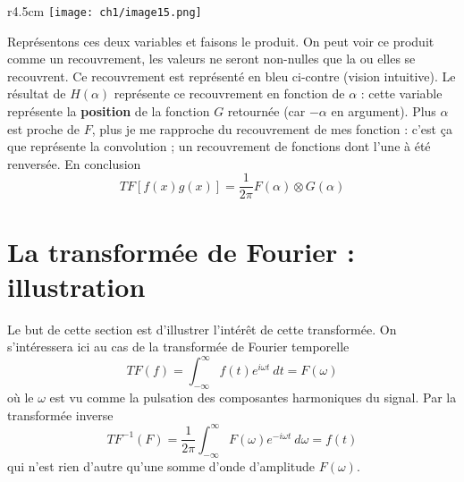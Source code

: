 \begin{wrapfigure}[8]{r}{4.5cm}
\vspace{-6mm}
\texttt{[image: ch1/image15.png]}
\end{wrapfigure}
Représentons ces deux variables et faisons le produit. On peut voir ce produit comme un 
recouvrement, les valeurs ne seront non-nulles que la ou elles se recouvrent. Ce recouvrement 
est représenté en bleu ci-contre (vision intuitive). Le résultat de $H(\alpha)$ représente 
ce recouvrement en fonction de $\alpha$ : cette variable représente la \textbf{position} de la
fonction $G$ retournée (car $-\alpha$ en argument). Plus $\alpha$ est proche de $F$, plus 
je me rapproche du recouvrement de mes fonction : c'est ça que représente la convolution ; un 
recouvrement de fonctions dont l'une à été renversée. En conclusion
\begin{equation}
TF[f(x)g(x)] = \frac{1}{2\pi}F(\alpha)\otimes G(\alpha)
\end{equation}














\newpage
\section{La transformée de Fourier : illustration}
Le but de cette section est d'illustrer l'intérêt de cette transformée. On s'intéressera 
ici au cas de la transformée de Fourier temporelle
\begin{equation}
TF(f) = \int_{-\infty}^\infty f(t)e^{i\omega t}\ dt = F(\omega)
\end{equation}
où le $\omega$ est vu comme la pulsation des composantes harmoniques du signal. Par la 
transformée inverse
\begin{equation}
TF^{-1}(F) = \dfrac{1}{2\pi}\int_{-\infty}^\infty F(\omega)e^{-i\omega t }\ d\omega = f(t)
\end{equation}
qui n'est rien d'autre qu'une somme d'onde d'amplitude $F(\omega)$.\\

